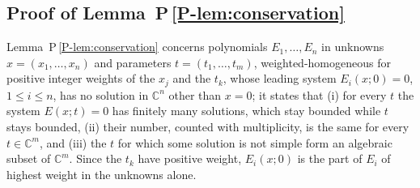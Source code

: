 \documentclass[11pt]{article}
\newcommand{\CC}{\mathbb C}
\numberwithin{equation}{section}
\begin{document}
\subsection{Proof of
\texorpdfstring{Lemma~P\,\ref{P-lem:conservation}}{the conservation lemma}}
\label{sec:conservation-proof}

Lemma~P\,\ref{P-lem:conservation} concerns polynomials
\(E_1,\ldots,E_n\) in unknowns \(x=(x_1,\ldots,x_n)\) and parameters
\(t=(t_1,\ldots,t_m)\), weighted-homogeneous for positive integer
weights of the \(x_j\) and the \(t_k\), whose leading system
\(E_i(x;0)=0\), \(1\le i\le n\), has no solution in \(\CC^n\) other than
\(x=0\); it states that (i) for every \(t\) the system \(E(x;t)=0\) has
finitely many solutions, which stay bounded while \(t\) stays bounded,
(ii) their number, counted with multiplicity, is the same for every
\(t\in\CC^m\), and (iii) the \(t\) for which some solution is not simple
form an algebraic subset of \(\CC^m\).
Since the \(t_k\) have positive weight, \(E_i(x;0)\) is the part of
\(E_i\) of highest weight in the unknowns alone.
\end{document}
